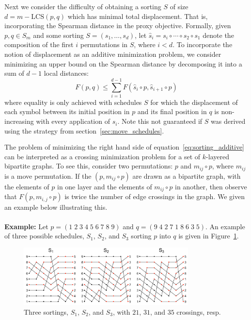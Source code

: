 \documentclass{siamart190516}
\begin{document}
Next we consider the difficulty of obtaining a sorting $S$ of size $d = m - \mathrm{LCS}(p,q)$ which has minimal total displacement. 
That is, incorporating the Spearman distance in the proxy objective. 
Formally, given $p, q \in S_m$ and some sorting  $S = (s_1, \dots, s_d)$, let $\hat{s}_i =  s_i \circ \cdots \circ s_2 \circ s_1$ denote the composition of the first $i$ permutations in $S$, where $i < d$. To incorporate the notion of displacement as an additive minimization problem, we consider minimizing an upper bound on the Spearman distance by decomposing it into a sum of $d-1$ local distances:
\begin{equation}\label{eq:sorting_additive}
F(p, q) \leq \sum\limits_{i=1}^{d-1} F(\hat{s}_i \circ p, \hat{s}_{i+1} \circ p)
\end{equation}
where equality is only achieved with schedules $S$ for which the displacement of each symbol between its initial position in $p$ and its final position in $q$ is non-increasing with every application of $s_i$. Note this not guaranteed if $S$ was derived using the strategy from section~\ref{sec:move_schedules}.

The problem of minimizing the right hand side of equation~\ref{eq:sorting_additive} can be interpreted as a crossing minimization problem for a set of $k$-layered bipartite graphs. To see this, consider two permutations: $p$ and $m_{ij} \circ p$, where $m_{ij}$ is a move permutation. If the $(p, m_{ij} \circ p)$ are drawn as a bipartite graph, with the elements of $p$ in one layer and the elements of $m_{ij} \circ p$ in another, then observe that $F(p, m_{i,j} \circ p)$ is twice the number of edge crossings in the graph. We given an example below illustrating this. 
\\
\\
\noindent \textbf{Example:} 
Let  $p= (1\;2\;3\;4\;5\;6\;7\;8\;9)$ 
and 
$q = (9\;4\;2\;7\;1\;8\;6\;3\;5)$.
An example of three possible schedules, $S_1$, $S_2$, and $S_3$ sorting $p$ into $q$ is given in Figure~\ref{fig:crossings}. 
\begin{figure}[!htb]
    \centering
    \includegraphics[width=0.80\textwidth]{crossings.png}
    \caption{Three sortings, $S_1$, $S_2$, and $S_3$, with $21$, $31$, and $35$ crossings, resp.}
    \label{fig:crossings}
\end{figure}
\end{document}
